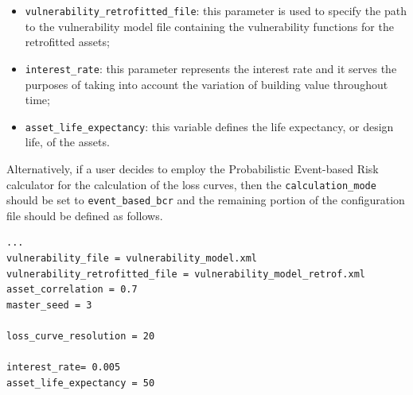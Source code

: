 \begin{itemize}
\item  \Verb+vulnerability_retrofitted_file+: this parameter is used to specify the path to the \gls{vulnerability model} file containing the \glspl{vulnerability function} for the retrofitted assets;
\item  \Verb+interest_rate+: this parameter represents the interest rate and it serves the purposes of taking into account the variation of building value throughout time;
\item  \Verb+asset_life_expectancy+: this variable defines the life expectancy, or design life, of the assets.
\end{itemize}

Alternatively, if a user decides to employ the Probabilistic Event-based Risk calculator for the calculation of the loss curves, then the \Verb+calculation_mode+ should be set to \Verb+event_based_bcr+ and the remaining portion of the configuration file should be defined as follows.

\begin{Verbatim}[frame=single, commandchars=\\\{\}, samepage=true]
...
vulnerability_file = vulnerability_model.xml
vulnerability_retrofitted_file = vulnerability_model_retrof.xml
asset_correlation = 0.7
master_seed = 3

loss_curve_resolution = 20

interest_rate= 0.005
asset_life_expectancy = 50
\end{Verbatim}